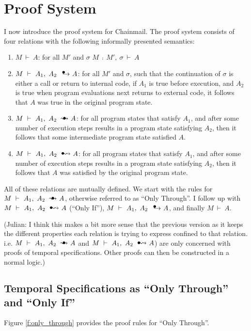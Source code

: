 \documentclass[12pt]{article}
\newcommand\trans{\mathlarger{\mathlarger \leadsto}}
\newcommand\intstep{\hspace{1.5mm}{\raisebox{3pt}{$\bullet$}}\hspace{-1.5mm}{\hookrightarrow}}
\newcommand\oi{\hspace{1mm}{\raisebox{1pt}{$\bullet$}}\hspace{-1mm}{\trans}}
\newcommand\ot{\hspace{2mm}{\raisebox{1pt}{$\bullet$}}\hspace{-3mm}{\trans}}
\newcommand\onlyIf[3]{#1,\ #2\ \oi\ #3}
\newcommand\oiInternal[3]{#1,\ #2\ \intstep\ #3}
\newcommand\onlyThrough[3]{#1,\ #2\ \ot\ #3}
\numberwithin{case}{lemma}
\numberwithin{case}{theorem}
\numberwithin{subcase}{case}
\begin{document}
\section{Proof System}
\label{s:proof_system}

I now introduce the proof system for Chainmail. The proof system consists of four relations with the following informally presented semantics:
\begin{enumerate}
\item
$M\ \vdash\ A$: for all $M'$ and $\sigma$ $M\ \fcmp\ M',\ \sigma\ \vdash\ A$
\item
$M\ \vdash\ \oiInternal{A_1}{A_2}{A}$: for all $M'$ and $\sigma$, such that the continuation of $\sigma$ is either a call or return to internal code, if $A_1$ is true before execution, and $A_2$ is true when program evaluations next returns to external code, it follows that $A$ 
was true in the original program state.
\item
$M\ \vdash\ \onlyThrough{A_1}{A_2}{A}$: for all program states that satisfy $A_1$, and after some number of execution steps results in a program state satisfying $A_2$, then it follows that some intermediate program state satisfied $A$.
\item
$M\ \vdash\ \onlyIf{A_1}{A_2}{A}$: for all program states that satisfy $A_1$, and after some number of execution steps results in a program state satisfying $A_2$, then it follows that $A$ was satisfied by the original program state.
\end{enumerate}
All of these relations are mutually defined. We start with the rules for $M\ \vdash\ \onlyThrough{A_1}{A_2}{A}$, otherwise referred to as ``Only Through''. I follow up with $M\ \vdash\ \onlyIf{A_1}{A_2}{A}$ (``Only If''), $M\ \vdash\ \oiInternal{A_1}{A_2}{A}$, and finally $M\ \vdash\ A$.

{\color{red}(Julian: I think this makes a bit more sense that the 
previous version as it keeps the different properties each relation is
trying to express confined to that relation. i.e. $M\ \vdash\ \onlyThrough{A_1}{A_2}{A}$ and 
$M\ \vdash\ \onlyIf{A_1}{A_2}{A}$) are only concerned with proofs of temporal 
specifications. Other proofs can then be constructed in a normal logic.)}

\subsection{Temporal Specifications as ``Only Through'' and ``Only If''}

Figure \ref{f:only_through} provides the proof rules for ``Only Through''.
\end{document}

